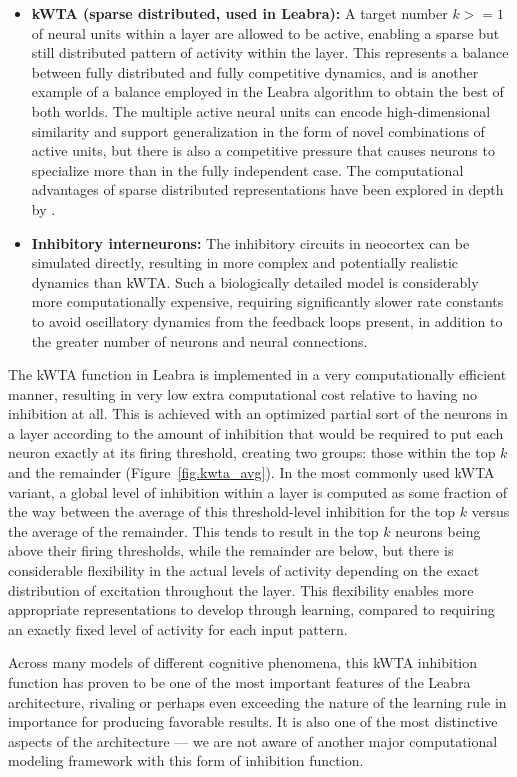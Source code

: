 \documentclass[11pt,twoside]{article}
\begin{document}
\begin{itemize}
\item {\bf kWTA (sparse distributed, used in Leabra):} A target number $k>=1$ of neural units within a layer are allowed to be active, enabling a sparse but still distributed pattern of activity within the layer.  This represents a balance between fully distributed and fully competitive dynamics, and is another example of a balance employed in the Leabra algorithm to obtain the best of both worlds.  The multiple active neural units can encode high-dimensional similarity and support generalization in the form of novel combinations of active units, but there is also a competitive pressure that causes neurons to specialize more than in the fully independent case.  The computational advantages of sparse distributed representations have been explored in depth by .
\item {\bf Inhibitory interneurons:} The inhibitory circuits in neocortex can be simulated directly, resulting in more complex and potentially realistic dynamics than kWTA.  Such a biologically detailed model is considerably more computationally expensive, requiring  significantly slower rate constants to avoid oscillatory dynamics from the feedback loops present, in addition to the greater number of neurons and neural connections. 
\end{itemize}

The kWTA function in Leabra is implemented in a very computationally efficient manner, resulting in very low extra computational cost relative to having no inhibition at all.  This is achieved with an optimized partial sort of the neurons in a layer according to the amount of inhibition that would be required to put each neuron exactly at its firing threshold, creating two groups: those within the top $k$ and the remainder (Figure~\ref{fig.kwta_avg}).  In the most commonly used kWTA variant, a global level of inhibition within a layer is computed as some fraction of the way between the average of this threshold-level inhibition for the top $k$ versus the average of the remainder.  This tends to result in the top $k$ neurons being above their firing thresholds, while the remainder are below, but there is considerable flexibility in the actual levels of activity depending on the exact distribution of excitation throughout the layer.  This flexibility enables more appropriate representations to develop through learning, compared to requiring an exactly fixed level of activity for each input pattern.

Across many models of different cognitive phenomena, this kWTA inhibition function has proven to be one of the most important features of the Leabra architecture, rivaling or perhaps even exceeding the nature of the learning rule in importance for producing favorable results.  It is also one of the most distinctive aspects of the architecture --- we are not aware of another major computational modeling framework with this form of inhibition function.
\end{document}
